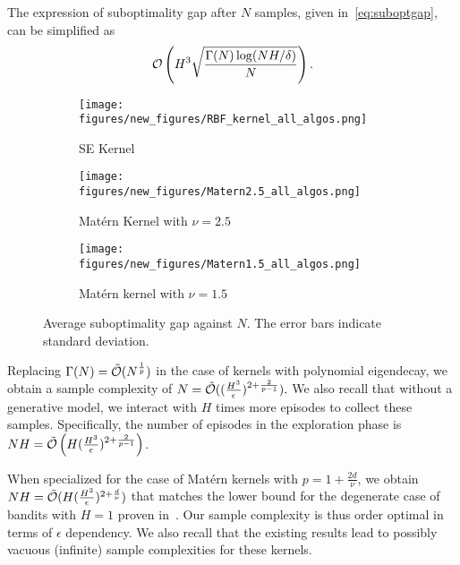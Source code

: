 The expression of suboptimality gap after $N$ samples, given in~\eqref{eq:suboptgap}, can be simplified as
\begin{equation*}
    \mathcal{O}\left(  H^3\sqrt{\frac{\Gamma(N)\log(NH/\delta)}{N}}\right).
\end{equation*} 
 
\begin{figure*}[h]
    \centering
    \begin{subfigure}{0.32\textwidth}
        \centering
        \texttt{[image: figures/new\_figures/RBF\_kernel\_all\_algos.png]}
        \caption{SE Kernel}
        \label{fig:RBF_all_algos}
    \end{subfigure}
    \begin{subfigure}{0.32\textwidth}
        \centering
        \texttt{[image: figures/new\_figures/Matern2.5\_all\_algos.png]} %
        \caption{Mat{\'e}rn Kernel with $\nu=2.5$}
        \label{fig:Matern2.5_all_algos}
    \end{subfigure}
    \begin{subfigure}{0.32\textwidth}
        \centering
        \texttt{[image: figures/new\_figures/Matern1.5\_all\_algos.png]} %
        \caption{Mat{\'e}rn kernel with $\nu=1.5$}
        \label{fig:Matern1.5_all_algos}
    \end{subfigure}
    \caption{Average suboptimality gap against $N$. The error bars indicate standard deviation.}
    \label{fig:overallresults}
\end{figure*}
\begin{remark}
Replacing $\Gamma(N)=\tilde{\mathcal{O}}(N^{\frac{1}{p}})$ in the case of kernels with polynomial eigendecay, we obtain a sample complexity of 
$
    N = \tilde{\mathcal{O}}((\frac{H^3}{\epsilon})^{2+\frac{2}{p-1}}).
$
We also recall that without a generative model, we interact with $H$ times more episodes to collect these samples. Specifically, the number of episodes in the exploration phase is 
$NH = \tilde{\mathcal{O}}\left(H(\frac{H^3}{\epsilon})^{2+\frac{2}{p-1}}\right)$.

\end{remark}

When specialized for the case of Mat{\'e}rn kernels with $p=1+\frac{2d}{\nu}$, we obtain $NH=\tilde{\mathcal{O}}(H(\frac{H^3}{\epsilon})^{2+\frac{d}{\nu}})$ that matches the lower bound for the degenerate case of bandits with $H=1$ proven in~\citet{scarlett2017lower}. Our sample complexity is thus order optimal in terms of $\epsilon$ dependency. We also recall that the existing results lead to possibly vacuous (infinite) sample complexities for these kernels.
